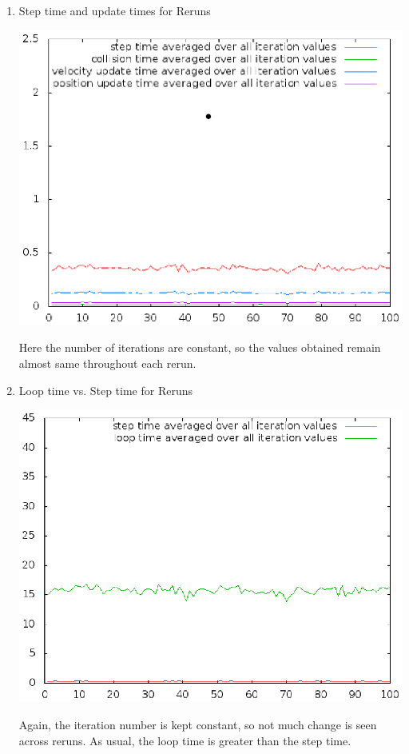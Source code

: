 \documentclass[a4paper,11pt]{article}
\begin{document}
\begin{enumerate}
  \item Step time and update times for Reruns
  \begin{center}
  \includegraphics{doc/g09_plot03.eps}
  \end{center}
  Here the number of iterations are constant, so the values obtained remain almost same throughout each rerun.
  
  \item Loop time vs. Step time for Reruns
  \begin{center}
  \includegraphics{doc/g09_plot04.eps}
  \end{center}
  Again, the iteration number is kept constant, so not much change is seen across reruns. As usual, the loop time is greater than the step time.
  

\end{enumerate}
\end{document}
